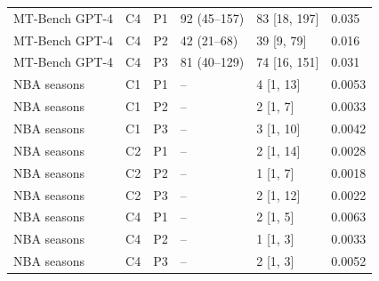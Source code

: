 {\begin{tabular}{llllll}
MT-Bench GPT-4 & C4 & P1 & 92 (45--157) & 83 [18, 197] & 0.035 \\
MT-Bench GPT-4 & C4 & P2 & 42 (21--68) & 39 [9, 79] & 0.016 \\
MT-Bench GPT-4 & C4 & P3 & 81 (40--129) & 74 [16, 151] & 0.031 \\
\midrule
NBA seasons & C1 & P1 & -- & 4 [1, 13] & 0.0053 \\
NBA seasons & C1 & P2 & -- & 2 [1, 7] & 0.0033 \\
NBA seasons & C1 & P3 & -- & 3 [1, 10] & 0.0042 \\
NBA seasons & C2 & P1 & -- & 2 [1, 14] & 0.0028 \\
NBA seasons & C2 & P2 & -- & 1 [1, 7] & 0.0018 \\
NBA seasons & C2 & P3 & -- & 2 [1, 12] & 0.0022 \\
NBA seasons & C4 & P1 & -- & 2 [1, 5] & 0.0063 \\
NBA seasons & C4 & P2 & -- & 1 [1, 3] & 0.0033 \\
NBA seasons & C4 & P3 & -- & 2 [1, 3] & 0.0052 \\
\bottomrule
\end{tabular}
}
